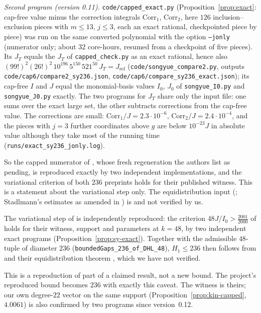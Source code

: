 \begin{sloppypar}
\emph{Second program (version 0.11).} \texttt{code/capped\_exact.py}
(Proposition~\ref{prop:exact}: cap-free value minus the correction integrals
$\mathrm{Corr}_1$, $\mathrm{Corr}_2$, here $126$ inclusion--exclusion pieces
with $m\le13$, $j\le3$, each an exact rational, checkpointed piece by piece)
was run on the same converted polynomial with the option \texttt{--jonly}
(numerator only; about $32$ core-hours, resumed from a checkpoint of five pieces). Its $J_T$ equals the $J_T$ of
\texttt{capped\_check.py} as an exact rational, hence also
$(99!)^2(26!)^2\,10^{196}\,5^{150}\,521^{50}\,J_T=J_{\mathrm{ref}}$
(\texttt{code/songyue\_compare2.py}, outputs
\texttt{code/cap6/compare2\_sy236.json}, \texttt{code/cap6/compare\_sy236\_exact.json});
its cap-free $I$ and $J$ equal the monomial-basis values $I_0$, $J_0$ of
\texttt{songyue\_I0.py} and \texttt{songyue\_J0.py} exactly. The two
programs for $J_T$ share only the input file: one sums over the exact large
set, the other subtracts corrections from the cap-free value. The
corrections are small: $\mathrm{Corr}_1/J=2.3\cdot10^{-6}$,
$\mathrm{Corr}_{2}/J=2.4\cdot10^{-4}$, and the pieces with $j=3$ further
coordinates above $g$ are below $10^{-23}J$ in absolute value although they
take most of the running time (\texttt{runs/exact\_sy236\_jonly.log}).
\end{sloppypar}
So the capped numerator of \cite{SY26}, whose fresh regeneration the authors
list as pending, is reproduced exactly by two independent implementations, and
the variational criterion of both $236$ preprints holds for their published
witness. This is a statement about the variational step only. The
equidistribution input (\cite[Theorem~4.18]{SY26}; Stadlmann's estimates as
amended in \cite{Kin26}) is  and not verified by us.

\begin{corollary}\label{cor:236}
The variational step of \cite{SY26} is independently reproduced: the
criterion $48J/I_0>\frac{2001}{2000}$ of \cite[Prop.~4.21]{SY26} holds for
their witness, support and parameters at $k=48$, by two independent exact
programs (Proposition~\ref{prop:sy-exact}). Together with the
 admissible $48$-tuple of diameter $236$
(\texttt{boundedGaps\_236\_of\_DHL\_48}), $H_1\le236$ then follows from
\cite[Theorem~4.33]{SY26} and their equidistribution theorem
\cite[Theorem~4.18]{SY26}, which we have not verified.
\end{corollary}
This is a reproduction of part of a claimed result, not a new bound. The
project's reproduced bound becomes $236$ with exactly this caveat. The
witness is theirs; our own degree-$22$ vector on the same support
(Proposition~\ref{prop:kin-capped}, $4.0061$) is also confirmed by two
programs since version~0.12.

